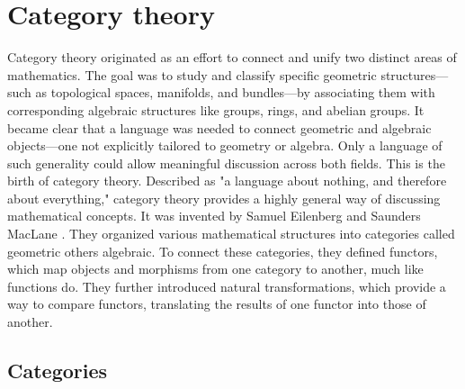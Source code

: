 \section{Category theory} \label{sec:catgories}


Category theory originated as an effort to connect and unify two distinct areas of mathematics.  The goal was to study and classify specific geometric structures—such as topological spaces, manifolds, and bundles—by associating them with corresponding algebraic structures like groups, rings, and abelian groups. It became clear that a language was needed to connect geometric and algebraic objects—one not explicitly tailored to geometry or algebra. Only a language of such generality could allow meaningful discussion across both fields.  This is the birth of category theory.
Described as "a language about nothing, and therefore about everything," category theory provides a highly general way of discussing mathematical concepts.  It was invented by Samuel Eilenberg and Saunders MacLane \cite{eilenbergGeneralTheoryNatural1945}. They organized various mathematical structures into categories called geometric others algebraic. To connect these categories, they defined functors, which map objects and morphisms from one category to another, much like functions do. They further introduced natural transformations, which provide a way to compare functors, translating the results of one functor into those of another. \cite{yanofskyMonoidalCategoryTheory2024}


\subsection{Categories}

